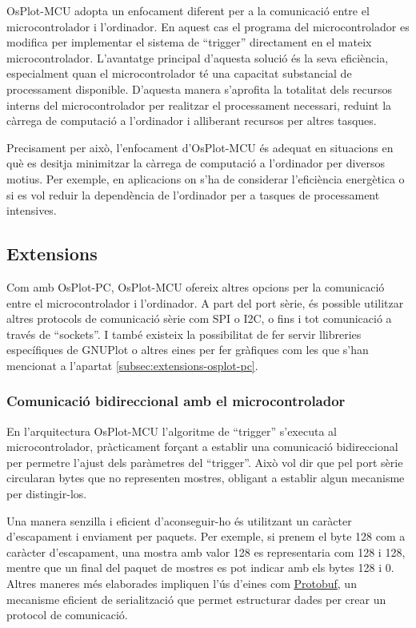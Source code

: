 \documentclass{tfgitic}[2023/06/30]
\begin{document}
OsPlot-MCU adopta un enfocament diferent per a la comunicació entre el
microcontrolador i l'ordinador. En aquest cas el programa del
microcontrolador es modifica per implementar el sistema de ``trigger''
directament en el mateix microcontrolador.
\newpage
L'avantatge principal d'aquesta solució és la seva eficiència,
especialment quan el microcontrolador té una capacitat substancial de
processament disponible. D'aquesta manera s'aprofita la totalitat dels
recursos interns del microcontrolador per realitzar el processament
necessari, reduint la càrrega de computació a l'ordinador i alliberant
recursos per altres tasques.

Precisament per això, l'enfocament d'OsPlot-MCU és adequat en
situacions en què es desitja minimitzar la càrrega de computació a
l'ordinador per diversos motius. Per exemple, en aplicacions on s'ha
de considerar l'eficiència energètica o si es vol reduir la
dependència de l'ordinador per a tasques de processament intensives.

\subsection{Extensions}

Com amb OsPlot-PC, OsPlot-MCU ofereix altres opcions per la
comunicació entre el microcontrolador i l'ordinador. A part del port
sèrie, és possible utilitzar altres protocols de comunicació sèrie com
SPI o I2C, o fins i tot comunicació a través de ``sockets''. I també
existeix la possibilitat de fer servir llibreries específiques de
GNUPlot o altres eines per fer gràfiques com les que s'han mencionat a
l'apartat \ref{subsec:extensions-osplot-pc}.

\subsubsection{Comunicació bidireccional amb el microcontrolador}

En l'arquitectura OsPlot-MCU l'algoritme de ``trigger'' s'executa al
microcontrolador, pràcticament forçant a establir una comunicació
bidireccional per permetre l'ajust dels paràmetres del ``trigger''.
Això vol dir que pel port sèrie circularan bytes que no representen
mostres, obligant a establir algun mecanisme per distingir-los.

Una manera senzilla i eficient d'aconseguir-ho és utilitzant un
caràcter d'escapament i enviament per paquets. Per exemple, si prenem
el byte 128 com a caràcter d'escapament, una mostra amb valor 128 es
representaria com 128 i 128, mentre que un final del paquet de mostres
es pot indicar amb els bytes 128 i 0. Altres maneres més elaborades
impliquen l'ús d'eines com
\href{https://protobuf.dev/}{\underline{Protobuf}}, un mecanisme
eficient de serialització que permet estructurar dades per crear un
protocol de comunicació.
\end{document}
